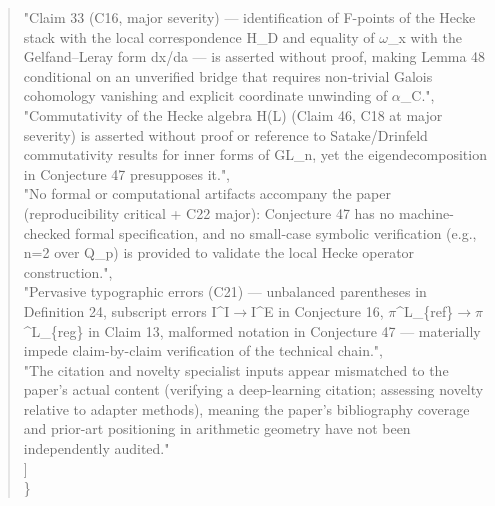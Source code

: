 \documentclass[11pt]{article}
\begin{document}
\begin{quote}
    "Claim 33 (C16, major severity) --- identification of F-points of the Hecke stack with the local correspondence H\_D and equality of \ensuremath{\omega}\_x with the Gelfand--Leray form dx/da --- is asserted without proof, making Lemma 48 conditional on an unverified bridge that requires non-trivial Galois cohomology vanishing and explicit coordinate unwinding of \ensuremath{\alpha}\_C.",\\
    "Commutativity of the Hecke algebra H(L) (Claim 46, C18 at major severity) is asserted without proof or reference to Satake/Drinfeld commutativity results for inner forms of GL\_n, yet the eigendecomposition in Conjecture 47 presupposes it.",\\
    "No formal or computational artifacts accompany the paper (reproducibility critical + C22 major): Conjecture 47 has no machine-checked formal specification, and no small-case symbolic verification (e.g., n=2 over Q\_p) is provided to validate the local Hecke operator construction.",\\
    "Pervasive typographic errors (C21) --- unbalanced parentheses in Definition 24, subscript errors I\^{}I\ensuremath{\to}I\^{}E in Conjecture 16, \ensuremath{\pi}\^{}L\_\{ref\}\ensuremath{\to}\ensuremath{\pi}\^{}L\_\{reg\} in Claim 13, malformed notation in Conjecture 47 --- materially impede claim-by-claim verification of the technical chain.",\\
    "The citation and novelty specialist inputs appear mismatched to the paper's actual content (verifying a deep-learning citation; assessing novelty relative to adapter methods), meaning the paper's bibliography coverage and prior-art positioning in arithmetic geometry have not been independently audited."\\
  ]\\
\}\\
\end{quote}
\end{document}
